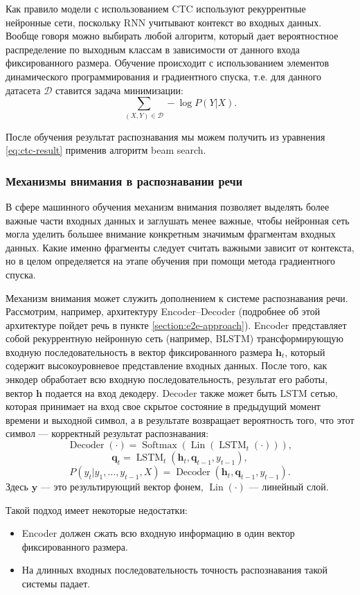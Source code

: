 Как правило модели с использованием CTC используют рекуррентные нейронные сети, поскольку RNN учитывают контекст во входных данных. Вообще говоря можно выбирать любой алгоритм, который дает вероятностное распределение по выходным классам в зависимости от данного входа фиксированного размера. Обучение происходит с использованием элементов динамического программирования и градиентного спуска, т.е. для данного датасета $\mathcal{D}$ ставится задача минимизации:
$$\sum_{(X, Y) \in \mathcal{D}} - \log P(Y | X).$$

После обучения результат распознавания мы можем получить из уравнения \ref{eq:ctc-result} применив алгоритм beam search.

\subsubsection{Механизмы внимания в распознавании речи}
В сфере машинного обучения механизм внимания позволяет выделять более важные части входных данных и заглушать менее важные, чтобы нейронная сеть могла уделить большее внимание конкретным значимым фрагментам входных данных. Какие именно фрагменты следует считать важными зависит от контекста, но в целом определяется на этапе обучения при помощи метода градиентного спуска.

Механизм внимания может служить дополнением к системе распознавания речи. Рассмотрим, например, архитектуру Encoder--Decoder (подробнее об этой архитектуре пойдет речь в пункте \ref{section:e2e-approach}). Encoder представляет собой рекуррентную нейронную сеть (например, BLSTM) трансформирующую входную последовательность в вектор фиксированного размера $\mathbf{h}_t$, который содержит высокоуровневое представление входных данных. После того, как энкодер обработает всю входную последовательность, результат его работы, вектор $\mathbf{h}$ подается на вход декодеру. Decoder также может быть LSTM сетью, которая принимает на вход свое скрытое состояние в предыдущий момент времени и выходной символ, а в результате возвращает вероятность того, что этот символ --- корректный результат распознавания:
$$\operatorname{Decoder}(\cdot) = \operatorname{Softmax}(\operatorname{Lin}(\operatorname{LSTM}_t(\cdot))),$$
$$\mathbf{q}_t = \operatorname{LSTM}_t(\mathbf{h}_t, \mathbf{q}_{t - 1}, y_{t - 1}),$$
$$P(y_t|y_1, \dots, y_{t - 1}, X) = \operatorname{Decoder}(\mathbf{h}_t, \mathbf{q}_{t - 1}, y_{t - 1}).$$
Здесь $\mathbf{y}$ --- это результирующий вектор фонем, $\operatorname{Lin}(\cdot)$ --- линейный слой.

Такой подход имеет некоторые недостатки:
\begin{itemize}
	\item Encoder должен сжать всю входную информацию в один вектор фиксированного размера.
	\item На длинных входных последовательность точность распознавания такой системы падает.
\end{itemize}

